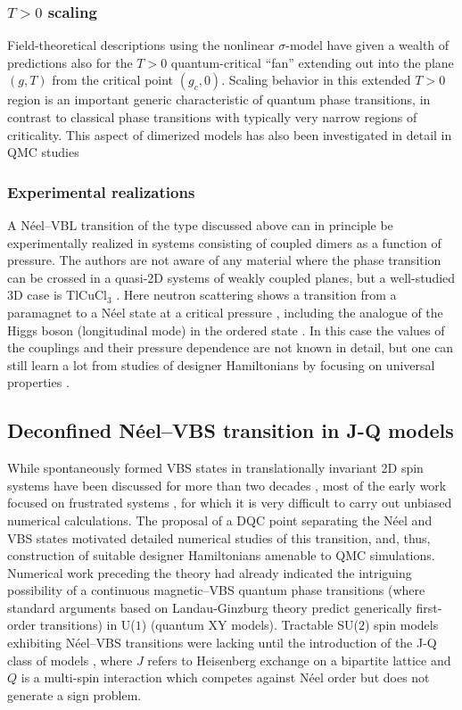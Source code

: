 \documentclass[range]{ar2e}
\begin{document}
\subsubsection{$T>0$ scaling}
Field-theoretical descriptions using the nonlinear $\sigma$-model \cite{Haldane83,Chakravarty89,Chubukov94} have given a wealth of 
predictions also for the $T>0$ quantum-critical ``fan'' extending out into the plane $(g,T)$  from the critical point $(g_c,0)$. Scaling 
behavior in this extended $T>0$ region is an important generic characteristic of quantum phase transitions, in contrast to classical phase transitions 
with typically very narrow regions of criticality. This aspect of dimerized models has also been investigated in detail in QMC 
studies \cite{Sandvik95,Brenig06,Sandvik11a}

\subsubsection{Experimental realizations}
A N\'eel--VBL transition of the type discussed above can in principle be experimentally realized in systems consisting of coupled dimers as a function 
of pressure. The authors are not aware of any material where the phase transition can be crossed in a quasi-2D systems of weakly 
coupled planes, but a well-studied 3D case is TlCuCl$_3$ \cite{Cavadini01,Ruegg04}. Here neutron scattering shows a transition from a paramagnet 
to a N\'eel state at a critical pressure \cite{Ruegg08}, including the analogue of the Higgs boson (longitudinal mode) in the ordered 
state \cite{Sachdev09}. In this case the values of the couplings and their pressure dependence are not known in detail, but one can still learn a lot from 
studies of designer Hamiltonians by focusing on universal properties \cite{Troyer97,Yao07,Jin12,Oitmaa11}.

\subsection{Deconfined N\'eel--VBS transition in J-Q models}
\label{ss:jq2}
While spontaneously formed VBS states in translationally invariant 2D spin systems have been discussed for more than two decades \cite{Chandra88,Dagotto89,Read89},
most of the early work focused on frustrated systems \cite{Dagotto89,Schulz96,Capriotti01}, for which it is very difficult to carry out unbiased numerical 
calculations. The proposal of a DQC point separating the N\'eel and VBS states motivated detailed numerical studies of this transition, and, thus, construction 
of suitable designer Hamiltonians amenable to QMC simulations. Numerical work preceding the theory \cite{Sandvik02} had already indicated the intriguing possibility 
of a continuous magnetic--VBS quantum phase transitions (where standard arguments based on Landau-Ginzburg theory predict generically first-order transitions) in
U($1$) (quantum XY models). Tractable SU($2$) spin models exhibiting N\'eel--VBS transitions were lacking until the introduction of the J-Q class of 
models \cite{Sandvik07}, where $J$ refers to Heisenberg exchange on a bipartite lattice and $Q$ is a multi-spin interaction which competes against N\'eel 
order but does not generate a sign problem. 
\end{document}
